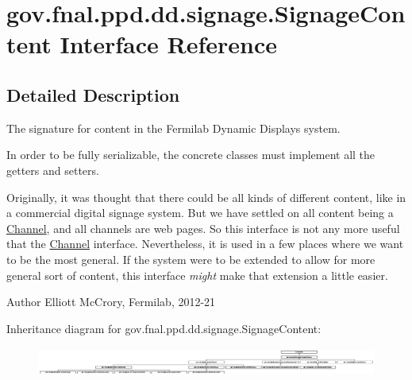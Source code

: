 \hypertarget{interfacegov_1_1fnal_1_1ppd_1_1dd_1_1signage_1_1SignageContent}{\section{gov.\-fnal.\-ppd.\-dd.\-signage.\-Signage\-Content Interface Reference}
\label{interfacegov_1_1fnal_1_1ppd_1_1dd_1_1signage_1_1SignageContent}
}


\subsection{Detailed Description}
The signature for content in the Fermilab Dynamic Displays system. 

In order to be fully serializable, the concrete classes must implement all the getters and setters. 

Originally, it was thought that there could be all kinds of different content, like in a commercial digital signage system. But we have settled on all content being a \hyperlink{interfacegov_1_1fnal_1_1ppd_1_1dd_1_1signage_1_1Channel}{Channel}, and all channels are web pages. So this interface is not any more useful that the \hyperlink{interfacegov_1_1fnal_1_1ppd_1_1dd_1_1signage_1_1Channel}{Channel} interface. Nevertheless, it is used in a few places where we want to be the most general. If the system were to be extended to allow for more general sort of content, this interface {\itshape might} make that extension a little easier. 

\begin{DoxyAuthor}{Author}
Elliott Mc\-Crory, Fermilab, 2012-\/21 
\end{DoxyAuthor}
Inheritance diagram for gov.\-fnal.\-ppd.\-dd.\-signage.\-Signage\-Content\-:\begin{figure}[H]
\begin{center}
\leavevmode
\includegraphics[height=0.963192cm]{interfacegov_1_1fnal_1_1ppd_1_1dd_1_1signage_1_1SignageContent}
\end{center}
\end{figure}
